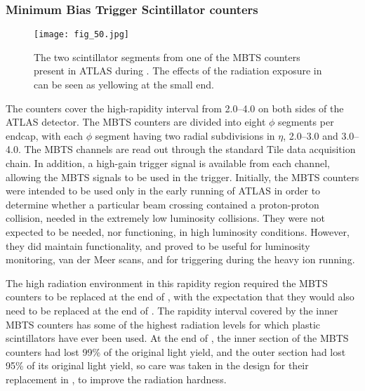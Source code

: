 \documentclass[cernpreprint, atlasdraft=false, UKenglish,british,orcidlogo, texmf, orcidlogo]{atlasdoc}
\begin{document}
\subsubsection{Minimum Bias Trigger Scintillator counters}
 
\begin{figure}[h!]
\centering
\texttt{[image: fig\_50.jpg]}
\caption{The two scintillator segments from one of the \gls{MBTS} counters present in ATLAS during \RunTwo. The effects of the radiation exposure in \RunTwo can be seen as yellowing at the small end.   }
\label{fig_atlas_MBTS_rad_damage}
\end{figure}
 
The  counters cover the high-rapidity interval from \numrange[range-phrase=--]{2.0}{4.0} on both sides of the ATLAS detector. The \gls{MBTS} counters are divided into eight $\phi$ segments per endcap, with each $\phi$ segment having two radial subdivisions in $\eta$, \numrange[range-phrase=--]{2.0}{3.0} and \numrange[range-phrase=--]{3.0}{4.0}. The \gls{MBTS} channels are read out through the standard \gls{Tile} data acquisition chain. In addition, a high-gain trigger signal is available from each channel, allowing the \gls{MBTS} signals to be used in the trigger. Initially, the \gls{MBTS} counters were intended to be used only in the early running of ATLAS in order to determine whether a particular beam crossing contained a proton-proton collision, needed in the extremely low luminosity collisions. They were not expected to be needed, nor functioning, in high luminosity conditions. However, they did maintain functionality, and proved to be useful for luminosity monitoring, van der Meer scans, and for triggering during the heavy ion running.
 
The high radiation environment in this rapidity region required the \gls{MBTS} counters to be replaced at the end of \RunOne, with the expectation that they would also need to be replaced at the end of \RunTwo. The rapidity interval covered by the inner \gls{MBTS} counters has some of the highest radiation levels for which plastic scintillators have ever been used. At the end of \RunTwo, the inner section of the \gls{MBTS} counters had lost 99\% of the original light yield, and the outer section had lost 95\% of its original light yield,  so care was taken in the design for their replacement in \RunThr, to improve the radiation hardness.
 
\end{document}
